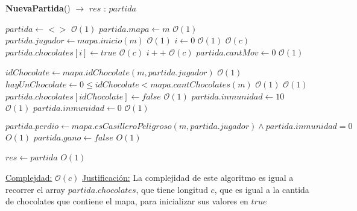 \documentclass[10pt, a4paper]{article}
\newcommand{\bigO}{\mathcal{O}}
\begin{document}
    \begin{Algoritmos}
        \begin{algorithm}[H]{\textbf{NuevaPartida}() $\to$ $res$ : $partida$}
            \begin{algorithmic}[1]
                \State $partida \gets <>$                               \Comment $\bigO(1)$
                \State $partida.mapa \gets m$                           \Comment $\bigO(1)$
                \State $partida.jugador \gets mapa.inicio(m)$           \Comment $\bigO(1)$
                \State $i \gets 0$                                      \Comment $\bigO(1)$
                                    \Comment $\bigO(c)$
                    \State $partida.chocolates[i] \gets true$           \Comment $\bigO(c)$
                    \State $i++$                                        \Comment $\bigO(c)$
                \EndWhile
                \State $partida.cantMov \gets 0$                        \Comment $\bigO(1)$

                \State $idChocolate \gets mapa.idChocolate(m, partida.jugador)$             \Comment $\bigO(1)$
                \State $hayUnChocolate \gets 0 \leq idChocolate < mapa.cantChocolates(m)$   \Comment $\bigO(1)$
                                                                       \Comment $\bigO(1)$
                    \State $partida.chocolates[idChocolate] \gets false$                    \Comment $\bigO(1)$
                    \State $partida.inmunidad \gets 10$                                     \Comment $\bigO(1)$
                \Else
                    \State $partida.inmunidad \gets 0$                                      \Comment $\bigO(1)$
                \EndIf

                \State $partida.perdio \gets mapa.esCasilleroPeligroso(m, partida.jugador) \wedge partida.inmunidad = 0$    \Comment $O(1)$
                \State $partida.gano \gets false$                                               \Comment $O(1)$

                \State $res \gets partida$                              \Comment $O(1)$

                \medskip
                \Statex
                \underline{Complejdad:} $\bigO(c)$
                \Statex
                \underline{Justificación:} La complejidad de este algoritmo es igual a recorrer el array $partida.chocolates$, que tiene longitud $c$, que es igual a la cantida de chocolates que contiene el mapa, para inicializar sus valores en $true$
                \end{algorithmic}
        \end{algorithm}


\end{Algoritmos}
\end{document}
